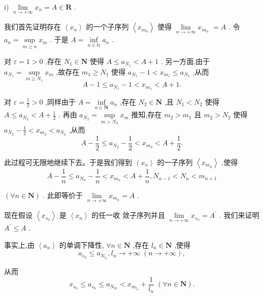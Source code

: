 i) $\mathop{\lim }\limits_{{n \rightarrow   + \infty }}{x}_{n} = A \in  \mathbf{R}$ .

我们首先证明存在 $\left\langle  {x}_{n}\right\rangle$ 的一个子序列 $\left\langle  {x}_{{m}_{n}}\right\rangle$ 使得 $\mathop{\lim }\limits_{{n \rightarrow   + \infty }}{x}_{{m}_{n}}$  $= A$ . 令 ${a}_{n} = \mathop{\sup }\limits_{{m \geq  n}}{x}_{m}$ . 于是 $A = \mathop{\inf }\limits_{{n \in  \mathbb{N}}}{a}_{n}$ .

对 $\varepsilon  = 1 > 0$ ,存在 ${N}_{1} \in  \mathbf{N}$ 使得 $A \leq  {a}_{{N}_{1}} < A + 1$ . 另一方面,由于 ${a}_{{N}_{1}} = \mathop{\sup }\limits_{{m \geq  {N}_{1}}}{x}_{m}$ ,故存在 ${m}_{1} \geq  {N}_{1}$ 使得 ${a}_{{N}_{1}} - 1 < {x}_{{m}_{1}} \leq  {a}_{{N}_{1}}$ ,从而
$$A - 1 \leq  {a}_{{N}_{1}} - 1 < {x}_{{m}_{1}} < A + 1.$$

对 $\varepsilon  = \frac{1}{2} > 0$ ,同样由于 $A = \mathop{\inf }\limits_{{n \in  \mathbf{N}}}{a}_{n}$ ,存在 ${N}_{2} \in  \mathbf{N}$ ,且 ${N}_{1} < {N}_{2}$ 使得 $A \leq  {a}_{{N}_{2}} < A + \frac{1}{2}$ . 再由 ${a}_{{N}_{2}} = \mathop{\sup }\limits_{{m > {N}_{2}}}{x}_{m}$ 推知,存在 ${m}_{2} > {m}_{1}$ 且 ${m}_{2} > {N}_{2}$ 使得 ${a}_{{N}_{2}} - \frac{1}{2} < {x}_{{m}_{2}} < {a}_{{N}_{2}}$ ,从而
$$A - \frac{1}{2} \leq  {a}_{{N}_{2}} - \frac{1}{2} < {x}_{{m}_{2}} < A + \frac{1}{2}.$$

此过程可无限地继续下去。于是我们得到 $\left\langle  {x}_{n}\right\rangle$ 的一子序列 $\left\langle  {x}_{{m}_{n}}\right\rangle$ ,使得
$$A - \frac{1}{n} \leq  {a}_{{N}_{n}} - \frac{1}{n} < {x}_{{m}_{n}} < A + \frac{1}{n},{N}_{n - 1} < {N}_{n} < {m}_{n + 1}$$

$\left( {\forall n \in  \mathbf{N}}\right)$ . 此即等价于 $\mathop{\lim }\limits_{{n \rightarrow   + \infty }}{x}_{{m}_{n}} = A$ .

现在假设 $\left\langle  {x}_{{s}_{n}}\right\rangle$ 是 $\left\langle  {x}_{n}\right\rangle$ 的任一收 敛子序列并且 $\mathop{\lim }\limits_{{n \rightarrow   + \infty }}{x}_{{s}_{n}} = {A}^{\prime }$ . 我们来证明 ${A}^{\prime } \leq  A$ .

事实上,由 $\left\langle  {a}_{n}\right\rangle$ 的单调下降性, $\forall n \in  \mathbf{N}$ ,存在 ${l}_{n} \in  \mathbf{N}$ ,使得
$${a}_{{s}_{n}} \leq  {a}_{{N}_{{l}_{n}}},{l}_{n} \rightarrow   + \infty \;\left( {n \rightarrow   + \infty }\right) ,$$

从而
$${x}_{{s}_{n}} \leq  {a}_{{s}_{n}} \leq  {a}_{{N}_{ln}} < {x}_{{m}_{{l}_{n}}} + \frac{1}{{l}_{n}}\;\left( {\forall n \in  \mathbf{N}}\right) .$$

